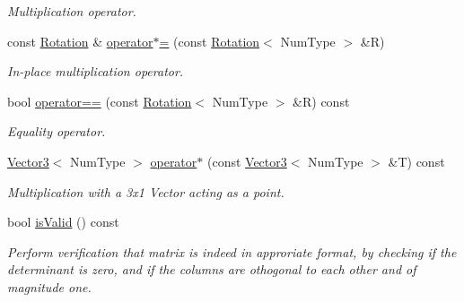 \begin{DoxyCompactItemize}
\begin{DoxyCompactList}\small\item\em Multiplication operator. \end{DoxyCompactList}\item 
\hypertarget{classscrews_1_1_rotation_a234302f5b123ea2ab445c6bee208aac5}{const \hyperlink{classscrews_1_1_rotation}{Rotation} \& \hyperlink{classscrews_1_1_rotation_a234302f5b123ea2ab445c6bee208aac5}{operator$\ast$=} (const \hyperlink{classscrews_1_1_rotation}{Rotation}$<$ Num\+Type $>$ \&R)}\label{classscrews_1_1_rotation_a234302f5b123ea2ab445c6bee208aac5}

\begin{DoxyCompactList}\small\item\em In-\/place multiplication operator. \end{DoxyCompactList}\item 
bool \hyperlink{classscrews_1_1_rotation_abf6ba4ff2b92cdfdc624981bbcfa718c}{operator==} (const \hyperlink{classscrews_1_1_rotation}{Rotation}$<$ Num\+Type $>$ \&R) const 
\begin{DoxyCompactList}\small\item\em Equality operator. \end{DoxyCompactList}\item 
\hypertarget{classscrews_1_1_rotation_ab6d1e4186d122c72c40487f14a4ad855}{\hyperlink{singletonscrews_1_1_translation}{Vector3}$<$ Num\+Type $>$ \hyperlink{classscrews_1_1_rotation_ab6d1e4186d122c72c40487f14a4ad855}{operator$\ast$} (const \hyperlink{singletonscrews_1_1_translation}{Vector3}$<$ Num\+Type $>$ \&T) const }\label{classscrews_1_1_rotation_ab6d1e4186d122c72c40487f14a4ad855}

\begin{DoxyCompactList}\small\item\em Multiplication with a 3x1 Vector acting as a point. \end{DoxyCompactList}\item 
\hypertarget{classscrews_1_1_rotation_af2acf293ba8719c9c151bd3e268baa77}{bool \hyperlink{classscrews_1_1_rotation_af2acf293ba8719c9c151bd3e268baa77}{is\+Valid} () const }\label{classscrews_1_1_rotation_af2acf293ba8719c9c151bd3e268baa77}

\begin{DoxyCompactList}\small\item\em Perform verification that matrix is indeed in approriate format, by checking if the determinant is zero, and if the columns are othogonal to each other and of magnitude one. \end{DoxyCompactList}\end{DoxyCompactItemize}
